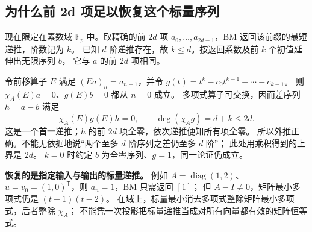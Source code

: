 \subsection{为什么前 2d 项足以恢复这个标量序列}
现在限定在素数域 $\mathbb F_p$ 中。取精确的前 $2d$ 项
$a_0,\ldots,a_{2d-1}$，BM 返回该前缀的最短递推，阶数记为 $k$。
已知 $d$ 阶递推存在，故 $k\le d$。按返回系数及前 $k$ 个初值延伸出无限序列 $b$，
它与 $a$ 的前 $2d$ 项相同。

令前移算子 $E$ 满足 $(Ea)_n=a_{n+1}$，并令
$g(t)=t^k-c_0t^{k-1}-\cdots-c_{k-1}$。
则 $\chi_A(E)a=0$、$g(E)b=0$ 都从 $n=0$ 成立。
多项式算子可交换，因而差序列 $h=a-b$ 满足
\[
\chi_A(E)g(E)h=0,\qquad \deg(\chi_Ag)=d+k\le2d.
\]
这是一个\textbf{首一}递推；$h$ 的前 $2d$ 项全零，依次递推便知所有项全零。
所以外推正确。不能无依据地说“两个至多 $d$ 阶序列之差仍至多 $d$ 阶”；
此处用乘积得到的上界是 $2d$。
$k=0$ 时约定 $b$ 为全零序列、$g=1$，同一论证仍成立。

\textbf{恢复的是指定输入与输出的标量递推。}
例如 $A=\operatorname{diag}(1,2)$、$u=v_0=(1,0)^{\mathsf T}$，则 $a_n=1$，BM 只需返回 $[1]$；
但 $A-I\ne0$，矩阵最小多项式仍是 $(t-1)(t-2)$。
在域上，标量最小消去多项式整除矩阵最小多项式，后者整除 $\chi_A$；
不能凭一次投影把标量递推当成对所有向量都有效的矩阵恒等式。

